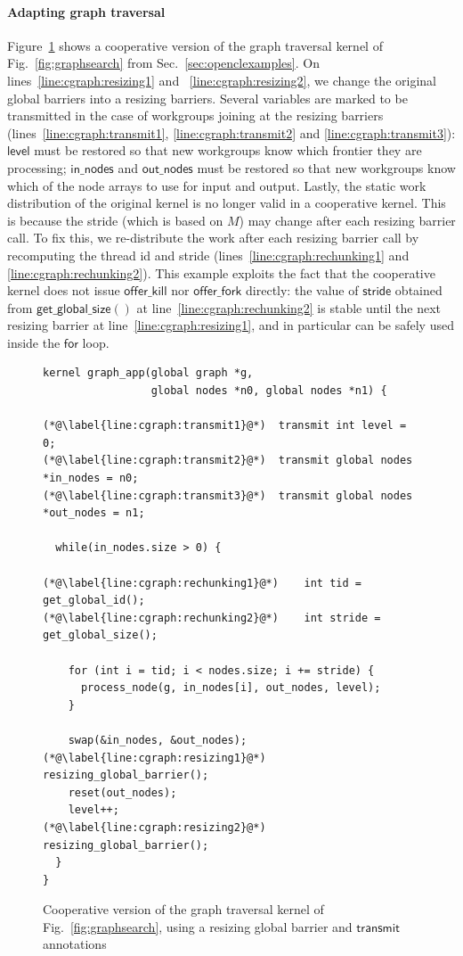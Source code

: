 \documentclass[numbers,nocopyrightspace,10pt]{sigplanconf}
\newcommand{\myfig}{Fig.~}
\newcommand{\myfiglong}{Figure~}
\newcommand{\mysec}{Sec.~}
\newcommand{\transmit}{\mathsf{transmit}}
\newcommand{\offerfork}{\mathsf{offer\_fork}}
\newcommand{\offerkill}{\mathsf{offer\_kill}}
\newcommand{\getglobalsize}{\mathsf{get\_global\_size}}
\newcommand{\keyword}[1]{\mathsf{#1}}
\begin{document}
\paragraph{Adapting graph traversal} 
\myfiglong\ref{fig:cgraphsearch} shows a cooperative version of the
graph traversal kernel of \myfig\ref{fig:graphsearch} from
\mysec\ref{sec:openclexamples}.  On lines~\ref{line:cgraph:resizing1}
and ~\ref{line:cgraph:resizing2}, we change the original global
barriers into a resizing barriers. Several variables are marked to be
transmitted in the case of workgroups joining at the resizing barriers
(lines~\ref{line:cgraph:transmit1}, \ref{line:cgraph:transmit2} and
\ref{line:cgraph:transmit3}): $\keyword{level}$ must be restored so
that new workgroups know which frontier they are processing;
$\keyword{in\_nodes}$ and $\keyword{out\_nodes}$ must be restored so
that new workgroups know which of the node arrays to use for input and
output. Lastly, the static work distribution of the original kernel is
no longer valid in a cooperative kernel. This is because the stride
(which is based on $M$) may change after each resizing barrier
call. To fix this, we re-distribute the work after each resizing
barrier call by recomputing the thread id and stride
(lines~\ref{line:cgraph:rechunking1} and
\ref{line:cgraph:rechunking2}). This example exploits the fact that
the cooperative kernel does not issue $\offerkill$ nor $\offerfork$
directly: the value of $\keyword{stride}$ obtained from
$\getglobalsize()$ at line~\ref{line:cgraph:rechunking2} is stable
until the next resizing barrier at line~\ref{line:cgraph:resizing1},
and in particular can be safely used inside the $\keyword{for}$ loop.

\begin{figure}

\begin{lstlisting}
kernel graph_app(global graph *g, 
                 global nodes *n0, global nodes *n1) {

(*@\label{line:cgraph:transmit1}@*)  transmit int level = 0;
(*@\label{line:cgraph:transmit2}@*)  transmit global nodes *in_nodes = n0;
(*@\label{line:cgraph:transmit3}@*)  transmit global nodes *out_nodes = n1;

  while(in_nodes.size > 0) {

(*@\label{line:cgraph:rechunking1}@*)    int tid = get_global_id();
(*@\label{line:cgraph:rechunking2}@*)    int stride = get_global_size();

    for (int i = tid; i < nodes.size; i += stride) {
      process_node(g, in_nodes[i], out_nodes, level);
    }

    swap(&in_nodes, &out_nodes);
(*@\label{line:cgraph:resizing1}@*)    resizing_global_barrier();
    reset(out_nodes);
    level++;
(*@\label{line:cgraph:resizing2}@*)    resizing_global_barrier();
  }
}
\end{lstlisting}
\caption{Cooperative version of the graph traversal kernel of \myfig\ref{fig:graphsearch}, using a resizing global barrier and $\transmit$ annotations}\label{fig:cgraphsearch}
\end{figure}
\end{document}
